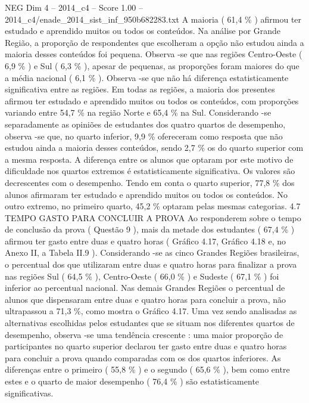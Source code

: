 \begin{textsample}{NEG Dim 4 – 2014\_c4 – Score 1.00 – 2014\_c4/enade\_2014\_sist\_inf\_950b682283.txt}
A maioria ( 61,4 \% ) afirmou ter estudado e aprendido muitos ou todos os conteúdos.
Na análise por Grande Região, a proporção de respondentes que escolheram a opção não estudou ainda a maioria desses conteúdos foi pequena.
Observa -se que nas regiões Centro-Oeste ( 6,9 \% ) e Sul ( 6,3 \% ), apesar de pequenas, as proporções foram maiores do que a média nacional ( 6,1 \% ).
Observa -se que não há diferença estatisticamente significativa entre as regiões.
Em todas as regiões, a maioria dos presentes afirmou ter estudado e aprendido muitos ou todos os conteúdos, com proporções variando entre 54,7 \% na região Norte e 65,4 \% na Sul.
Considerando -se separadamente as opiniões de estudantes dos quatro quartos de desempenho, observa -se que, no quarto inferior, 9,9 \% ofereceram como resposta que não estudou ainda a maioria desses conteúdos, sendo 2,7 \% os do quarto superior com a mesma resposta.
A diferença entre os alunos que optaram por este motivo de dificuldade nos quartos extremos é estatisticamente significativa.
Os valores são decrescentes com o desempenho.
Tendo em conta o quarto superior, 77,8 \% dos alunos afirmaram ter estudado e aprendido muitos ou todos os conteúdos.
No outro extremo, no primeiro quarto, 45,2 \% optaram pelas mesmas categorias. 4.7 TEMPO GASTO PARA CONCLUIR A PROVA Ao responderem sobre o tempo de conclusão da prova ( Questão 9 ), mais da metade dos estudantes ( 67,4 \% ) afirmou ter gasto entre duas e quatro horas ( Gráfico 4.17, Gráfico 4.18 e, no Anexo II, a Tabela II.9 ).
Considerando -se as cinco Grandes Regiões brasileiras, o percentual dos que utilizaram entre duas e quatro horas para finalizar a prova nas regiões Sul ( 64,5 \% ), Centro-Oeste ( 66,0 \% ) e Sudeste ( 67,1 \% ) foi inferior ao percentual nacional.
Nas demais Grandes Regiões o percentual de alunos que dispensaram entre duas e quatro horas para concluir a prova, não ultrapassou a 71,3 \%, como mostra o Gráfico 4.17.
Uma vez sendo analisadas as alternativas escolhidas pelos estudantes que se situam nos diferentes quartos de desempenho, observa -se uma tendência crescente : uma maior proporção de participantes no quarto superior declarou ter gasto entre duas e quatro horas para concluir a prova quando comparadas com os dos quartos inferiores.
As diferenças entre o primeiro ( 55,8 \% ) e o segundo ( 65,6 \% ), bem como entre estes e o quarto de maior desempenho ( 76,4 \% ) são estatisticamente significativas.

\end{textsample}
